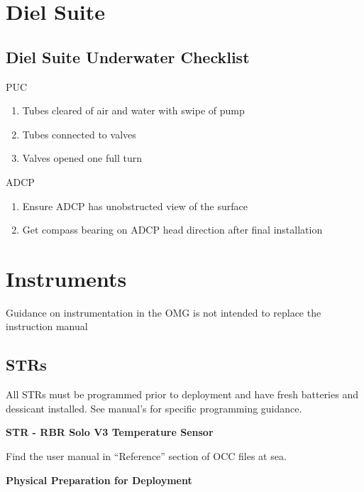 \documentclass[]{book}
\providecommand{\tightlist}{%
  \setlength{\itemsep}{0pt}\setlength{\parskip}{0pt}}
\begin{document}
\hypertarget{diel-suite}{%
\chapter{Diel Suite}\label{diel-suite}}

\hypertarget{diel-suite-underwater-checklist}{%
\section{Diel Suite Underwater Checklist}\label{diel-suite-underwater-checklist}}

PUC

\begin{enumerate}
\def\labelenumi{\arabic{enumi}.}
\tightlist
\item
  Tubes cleared of air and water with swipe of pump
\item
  Tubes connected to valves
\item
  Valves opened one full turn
\end{enumerate}

ADCP

\begin{enumerate}
\def\labelenumi{\arabic{enumi}.}
\tightlist
\item
  Ensure ADCP has unobstructed view of the surface
\item
  Get compass bearing on ADCP head direction after final installation
\end{enumerate}

\hypertarget{instruments}{%
\chapter{Instruments}\label{instruments}}

Guidance on instrumentation in the OMG is not intended to replace the instruction manual

\hypertarget{strs}{%
\section{STRs}\label{strs}}

All STRs must be programmed prior to deployment and have fresh batteries and dessicant installed. See manual's for specific programming guidance.

\textbf{STR - RBR Solo V3 Temperature Sensor}

Find the user manual in ``Reference'' section of OCC files at sea.

\textbf{Physical Preparation for Deployment}
\end{document}
